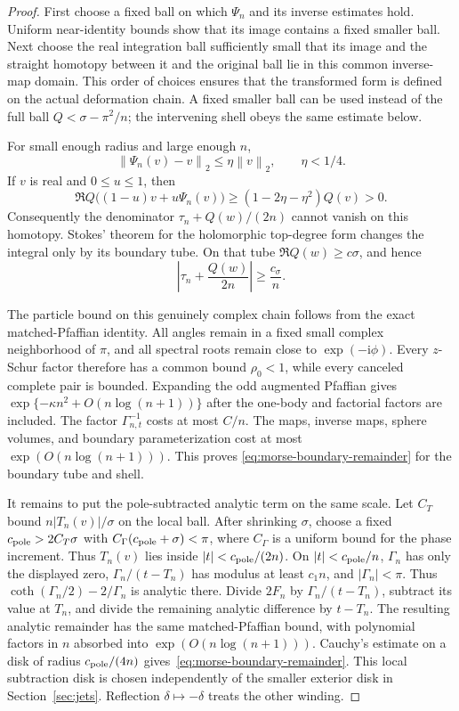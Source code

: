\documentclass[11pt]{article}
\numberwithin{equation}{section}
\theoremstyle{definition}
\newcommand{\ii}{\mathrm i}
\newcommand{\norm}[1]{\left\lVert#1\right\rVert}
\begin{document}
\begin{proof}
First choose a fixed ball on which $\Psi_n$ and its inverse estimates
hold.  Uniform near-identity bounds show that its image contains a
fixed smaller ball.  Next choose the real integration ball sufficiently
small that its image and the straight homotopy between it and the
original ball lie in this common inverse-map domain.  This order of
choices ensures that the transformed form is defined on the actual
deformation chain.  A fixed smaller ball can be used instead of the
full ball $Q<\sigma-\pi^2/n$; the intervening shell obeys the same
estimate below.

For small enough radius and large enough $n$,
\[
 \norm{\Psi_n(v)-v}_2\le\eta\norm v_2,\qquad \eta<1/4.
\]
If $v$ is real and $0\le u\le1$, then
\begin{equation}
 \Re Q\bigl((1-u)v+u\Psi_n(v)\bigr)
 \ge(1-2\eta-\eta^2)Q(v)>0.
 \label{eq:morse-homotopy-positive}
\end{equation}
Consequently the denominator $\tau_n+Q(w)/(2n)$ cannot vanish on
this homotopy.  Stokes' theorem for the holomorphic top-degree form
changes the integral only by its boundary tube.  On that tube
$\Re Q(w)\ge c\sigma$, and hence
\[
 \left|\tau_n+\frac{Q(w)}{2n}\right|\ge\frac{c_\sigma}{n}.
\]

The particle bound on this genuinely complex chain follows from the
exact matched-Pfaffian identity.  All angles remain in a fixed small
complex neighborhood of $\pi$, and all spectral roots remain close
to $\exp(-\ii\phi)$.  Every $z$-Schur factor therefore has a common
bound $\rho_0<1$, while every canceled complete pair is bounded.
Expanding the odd augmented Pfaffian gives
$\exp\{-\kappa n^2+O(n\log(n+1))\}$ after the one-body and factorial
factors are included. The factor
$\Gamma_{n,t}^{-1}$ costs at most $C/n$.  The maps, inverse maps,
sphere volumes, and boundary parameterization cost at most
$\exp(O(n\log(n+1)))$.  This proves
\eqref{eq:morse-boundary-remainder} for the boundary tube and shell.

It remains to put the pole-subtracted analytic term on the same scale.  Let $C_T$
bound $n|T_n(v)|/\sigma$ on the local ball. After shrinking $\sigma$,
choose a fixed $c_{\rm pole}>2C_T\sigma$ with
$C_\Gamma(c_{\rm pole}+\sigma)<\pi$, where $C_\Gamma$ is a uniform
bound for the phase increment. Thus $T_n(v)$ lies inside
$|t|<c_{\rm pole}/(2n)$. On $|t|<c_{\rm pole}/n$,
$\Gamma_n$ has only the displayed zero,
$\Gamma_n/(t-T_n)$ has modulus at least $c_1n$, and
$|\Gamma_n|<\pi$.  Thus
$\coth(\Gamma_n/2)-2/\Gamma_n$ is analytic there.  Divide
$2F_n$ by $\Gamma_n/(t-T_n)$, subtract its value at $T_n$, and
divide the remaining analytic difference by $t-T_n$.
The resulting analytic remainder has the same matched-Pfaffian
bound, with polynomial factors in $n$ absorbed into
$\exp(O(n\log(n+1)))$.  Cauchy's estimate on a disk of radius
$c_{\rm pole}/(4n)$ gives~\eqref{eq:morse-boundary-remainder}. This
local subtraction disk is chosen independently of the smaller exterior
disk in Section~\ref{sec:jets}. Reflection
$\delta\mapsto-\delta$ treats the other winding.
\end{proof}
\end{document}

